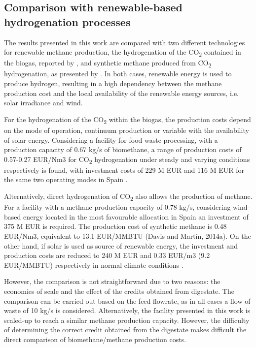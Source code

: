 \begin{refsection}[referencesCh7]
\subsection{Comparison with renewable-based hydrogenation processes}
The results presented in this work are compared with two different technologies for renewable methane production, the hydrogenation of the CO\textsubscript{2} contained in the biogas, reported by \citet{curto2019renewable}, and synthetic methane produced from CO\textsubscript{2} hydrogenation, as presented by \citet{davis2014optimala, davis2014optimalb}. In both cases, renewable energy is used to produce hydrogen, resulting in a high dependency between the methane production cost and the local availability of the renewable energy sources, i.e. solar irradiance and wind.

For the hydrogenation of the CO\textsubscript{2} within the biogas, the production costs depend on the mode of operation, continuum production or variable with the availability of solar energy. Considering a facility for food waste processing, with a production capacity of 0.67 kg/s of biomethane, a range of production costs of 0.57-0.27 EUR/Nm3 for CO\textsubscript{2} hydrogenation under steady and varying conditions respectively is found, with investment costs of 229 M EUR and 116 M EUR for the same two operating modes in Spain \citep{curto2019renewable}.

Alternatively, direct hydrogenation of CO\textsubscript{2} also allows the production of methane. For a facility with a methane production capacity of 0.78 kg/s, considering wind-based energy located in the most favourable allocation in Spain an investment of 375 M EUR is required. The production cost of synthetic methane is 0.48 EUR/Nm3, equivalent to 13.1 EUR/MMBTU (Davis and Martín, 2014a). On the other hand, if solar is used as source of renewable energy, the investment and production costs are reduced to 240 M EUR and 0.33 EUR/m3 (9.2 EUR/MMBTU) respectively in normal climate conditions \citep{davis2014optimalb}.

However, the comparison is not straightforward due to two reasons: the economies of scale and the effect of the credits obtained from digestate. The comparison can be carried out based on the feed flowrate, as in all cases a flow of waste of 10 kg/s is considered. Alternatively, the facility presented in this work is scaled-up to reach a similar methane production capacity. However, the difficulty of determining the correct credit obtained from the digestate makes difficult the direct comparison of biomethane/methane production costs.


\end{refsection}
